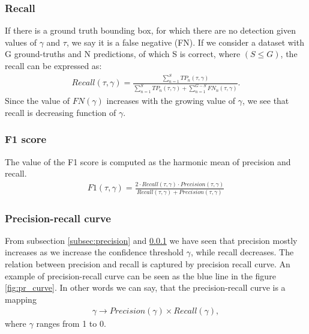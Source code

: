 \subsubsection{Recall}
\label{subsec:recall}
If there is a ground truth bounding box, for which there are no detection given values of $\gamma$ and $\tau$, we say it is a false negative (FN). If we consider a dataset with G ground-truths and N predictions, of which S is correct, where $(S \leq G)$, the recall can be expressed as:
\begin{align}
    Recall(\tau, \gamma) = \frac{\sum_{n=1}^S TP_n(\tau, \gamma)}{\sum_{n=1}^S TP_n(\tau, \gamma) + \sum_{n=1}^{G-S} FN_n(\tau, \gamma)}.
\end{align}
Since the value of $FN(\gamma)$ increases with the growing value of $\gamma$, we see that recall is decreasing function of $\gamma$.
\subsubsection{F1 score}
The value of the F1 score is computed as the harmonic mean of precision and recall.
\begin{align}
    F1(\tau, \gamma) = \frac{2 \cdot Recall(\tau,\gamma) \cdot Precision(\tau, \gamma)}{Recall(\tau,\gamma) + Precision(\tau, \gamma)}
\end{align}

\subsubsection{Precision-recall curve}
From subsection \ref{subsec:precision} and \ref{subsec:recall} we have seen that precision mostly increases as we increase the confidence threshold $\gamma$, while recall decreases. The relation between precision and recall is captured by precision recall curve. An example of precision-recall curve can be seen as the blue line in the figure \ref{fig:pr_curve}. In other words we can say, that the precision-recall curve is a mapping
\begin{align}
    \gamma \rightarrow Precision(\gamma) \times  Recall(\gamma),
    \label{eq:pr_curve}
\end{align}
where $\gamma$ ranges from 1 to 0.

